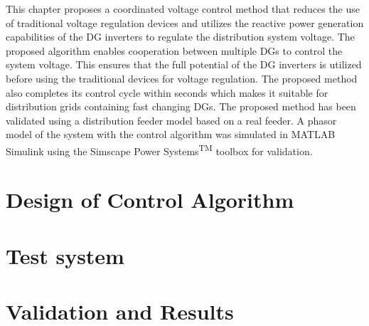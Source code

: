 This chapter proposes a coordinated voltage control method that reduces the use of traditional voltage regulation devices and utilizes the reactive power generation capabilities of the DG inverters to regulate the distribution system voltage. The proposed algorithm enables cooperation between multiple DGs to control the system voltage. This ensures that the full potential of the DG inverters is utilized before using the traditional devices for voltage regulation. The proposed method also completes its control cycle within seconds which makes it suitable for distribution grids containing fast changing DGs. The proposed method has been validated using a distribution feeder model based on a real feeder. A phasor model of the system with the control algorithm was simulated in MATLAB\textsuperscript{\textregistered} Simulink\textsuperscript{\textregistered} using the Simscape Power Systems\textsuperscript{TM} toolbox for validation.


\section{Design of Control Algorithm}\label{sec:design}


\section{Test system}


\section{Validation and Results}\label{sec:val}

